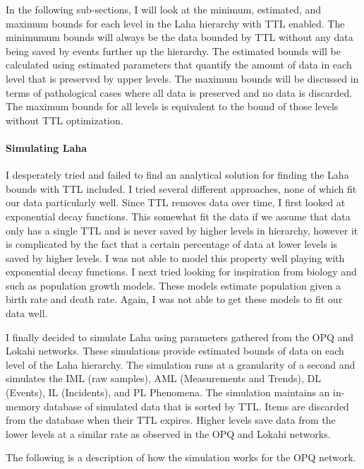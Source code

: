 In the following sub-sections, I will look at the minimum, estimated, and maximum bounds for each level in the Laha hierarchy with TTL enabled. The minimumum bounds will always be the data bounded by TTL without any data being saved by events further up the hierarchy. The estimated bounds will be calculated using estimated parameters that quantify the amount of data in each level that is preserved by upper levels. The maximum bounds will be discussed in terms of pathological cases where all data is preserved and no data is discarded. The maximum bounds for all levels is equivalent to the bound of those levels without TTL optimization.

\paragraph{Simulating Laha}

I desperately tried and failed to find an analytical solution for finding the Laha bounds with TTL included. I tried several different approaches, none of which fit our data particularly well. Since TTL removes data over time, I first looked at exponential decay functions. This somewhat fit the data if we assume that data only has a single TTL and is never saved by higher levels in hierarchy, however it is complicated by the fact that a certain percentage of data at lower levels is saved by higher levels. I was not able to model this property well playing with exponential decay functions. I next tried looking for inspiration from biology and  such as population growth models. These models estimate population given a birth rate and death rate. Again, I was not able to get these models to fit our data well.

I finally decided to simulate Laha using parameters gathered from the OPQ and Lokahi networks. These simulations provide estimated bounds of data on each level of the Laha hierarchy. The simulation runs at a granularity of a second and simulates the IML (raw samples), AML (Measurements and Trends), DL (Events), IL (Incidents), and PL Phenomena. The simulation maintains an in-memory database of simulated data that is sorted by TTL. Items are discarded from the database when their TTL expires. Higher levels save data from the lower levels at a similar rate as observed in the OPQ and Lokahi networks.

The following is a description of how the simulation works for the OPQ network.

